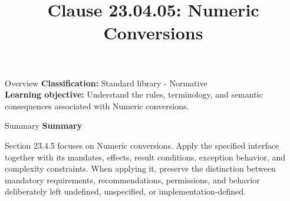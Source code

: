 \documentclass[10pt,letterpaper]{article}
\title{Clause 23.04.05: Numeric Conversions}
\author{}
\date{}
\begin{document}
\maketitle
\begin{CornellOverviewBox}{Overview}
\textbf{Classification:} Standard library - Normative\\[2pt]
\textbf{Learning objective:} Understand the rules, terminology, and semantic consequences associated with Numeric conversions.
\end{CornellOverviewBox}\begin{CornellSummaryBox}{Summary}
{\sffamily\bfseries\color{Accent} Summary}\par\vspace{3pt}Section 23.4.5 focuses on Numeric conversions. Apply the specified interface together with its mandates, effects, result conditions, exception behavior, and complexity constraints. When applying it, preserve the distinction between mandatory requirements, recommendations, permissions, and behavior deliberately left undefined, unspecified, or implementation-defined.
\end{CornellSummaryBox}
\end{document}
